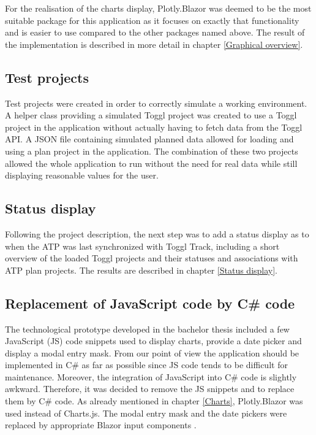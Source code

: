 For the realisation of the charts display, Plotly.Blazor was deemed to be the most suitable package for this application as it focuses on exactly that functionality and is easier to use compared to the other packages named above. The result of the implementation is described in more detail in chapter \ref{Graphical overview}.

\subsection{Test projects}
Test projects were created in order to correctly simulate a working environment. A helper class providing a simulated Toggl project was created to use a Toggl project in the application without actually having to fetch data from the Toggl API. A JSON file containing simulated planned data allowed for loading and using a plan project in the application. The combination of these two projects allowed the whole application to run without the need for real data while still displaying reasonable values for the user.

\subsection{Status display}
Following the project description, the next step was to add a status display as to when the ATP was last synchronized with Toggl Track, including a short overview of the loaded Toggl projects and their statuses and associations with ATP plan projects. The results are described in chapter \ref{Status display}.

\subsection{Replacement of JavaScript code by C\# code} \label{JS replacement}
The technological prototype developed in the bachelor thesis included a few JavaScript (JS) code snippets used to display charts, provide a date picker and display a modal entry mask. From our point of view the application should be implemented in C\# as far as possible since JS code tends to be difficult for maintenance. Moreover, the integration of JavaScript into C\# code is slightly awkward. Therefore, it was decided to remove the JS snippets and to replace them by C\# code. As already mentioned in chapter \ref{Charts}, Plotly.Blazor was used instead of Charts.js. The modal entry mask and the date pickers were replaced by appropriate Blazor input components \cite{blazor-input-url}.

